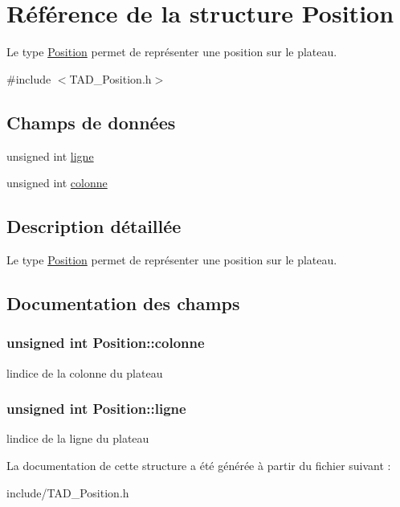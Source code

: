 \hypertarget{structPosition}{}\section{Référence de la structure Position}
\label{structPosition}


Le type \hyperlink{structPosition}{Position} permet de représenter une position sur le plateau.  




{\ttfamily \#include $<$T\+A\+D\+\_\+\+Position.\+h$>$}

\subsection*{Champs de données}
\begin{DoxyCompactItemize}
\item 
unsigned int \hyperlink{structPosition_a0c539d474eeb3d627a65e19af2d36e08}{ligne}
\item 
unsigned int \hyperlink{structPosition_a66392cca8222d344ec19a7b576f4ab31}{colonne}
\end{DoxyCompactItemize}


\subsection{Description détaillée}
Le type \hyperlink{structPosition}{Position} permet de représenter une position sur le plateau. 

\subsection{Documentation des champs}
\hypertarget{structPosition_a66392cca8222d344ec19a7b576f4ab31}{}
\subsubsection[{colonne}]{\setlength{\rightskip}{0pt plus 5cm}unsigned int Position\+::colonne}\label{structPosition_a66392cca8222d344ec19a7b576f4ab31}
l\textquotesingle{}indice\textquotesingle{} de la colonne du plateau \hypertarget{structPosition_a0c539d474eeb3d627a65e19af2d36e08}{}
\subsubsection[{ligne}]{\setlength{\rightskip}{0pt plus 5cm}unsigned int Position\+::ligne}\label{structPosition_a0c539d474eeb3d627a65e19af2d36e08}
l\textquotesingle{}indice de la ligne du plateau 

La documentation de cette structure a été générée à partir du fichier suivant \+:\begin{DoxyCompactItemize}
\item 
include/T\+A\+D\+\_\+\+Position.\+h\end{DoxyCompactItemize}
